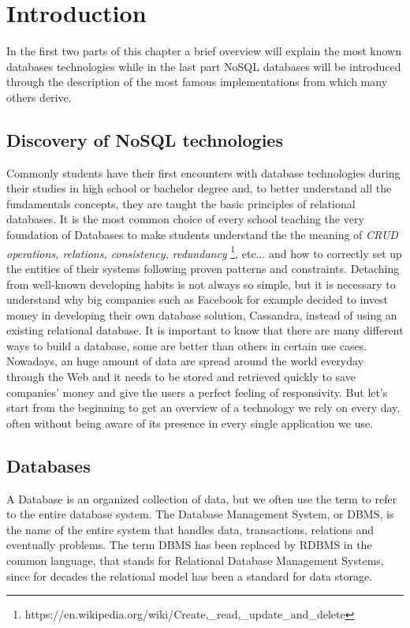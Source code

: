 \chapter{Introduction}
\label{cha:intro}

In the first two parts of this chapter a brief overview will explain the most known databases technologies while in the last part NoSQL databases will be introduced through the description of the most famous implementations from which many others derive.


\section{Discovery of NoSQL technologies}
\label{sec:context}

Commonly students have their first encounters with database technologies during their studies in high school or bachelor degree and, to better understand all the fundamentals concepts, they are taught the basic principles of relational databases.
It is the most common choice of every school teaching the very foundation of Databases to make students understand the the meaning of \textit{CRUD operations, relations, consistency, redundancy} \footnote{https://en.wikipedia.org/wiki/Create,\_read,\_update\_and\_delete}, etc... and how to correctly set up the entities of their systems following proven patterns and constraints.
Detaching from well-known developing habits is not always so simple, but it is necessary to understand why big companies such as Facebook for example decided to invest money in developing their own database solution, Cassandra, instead of using an existing relational database.
It is important to know that there are many different ways to build a database, some are better than others in certain use cases. Nowadays, an huge amount of data are spread around the world everyday through the Web and it needs to be stored and retrieved quickly to save companies' money and give the users a perfect feeling of responsivity.
But let’s start from the beginning to get an overview of a technology we rely on every day, often without being aware of its presence in every single application we use.


\section{Databases}
\label{sec:problem}

A Database is an organized collection of data, but  we often use the term to refer to the entire database system. The Database Management System, or DBMS, is the name of the entire system that handles data, transactions, relations and eventually problems.
The term DBMS has been replaced by RDBMS in the common language, that stands for Relational Database Management Systems, since for decades the relational model has been a standard for data storage.


